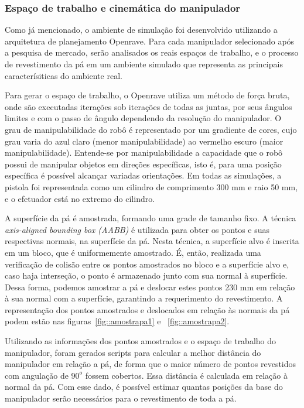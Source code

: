 \subsubsection{Espaço de trabalho e cinemática do
manipulador}\label{sec::cinematica} 
Como já mencionado, o ambiente de simulação
foi desenvolvido utilizando a arquitetura de planejamento Openrave. Para cada manipulador selecionado após a
pesquisa de mercado, serão analisados os reais espaços de trabalho, e o processo de
revestimento da pá em um ambiente simulado que representa as principais
caracterísiticas do ambiente real.

Para gerar o espaço de trabalho, o Openrave utiliza um método de força bruta,
onde são executadas iterações sob iterações de todas as juntas, por seus ângulos
limites e com o passo de ângulo dependendo da resolução do manipulador. O grau
de manipulabilidade do robô é representado por um gradiente de cores, cujo grau
varia do azul claro (menor manipulabilidade) ao vermelho escuro (maior manipulabilidade).
Entende-se por manipulabilidade a capacidade que o robô possui de manipular
objetos em direções específicas, isto é, para uma posição específica é
possível alcançar variadas orientações. Em todas as simulações, a pistola foi
representada como um cilindro de comprimento 300 mm e raio 50 mm, e o efetuador está no extremo do cilindro.

A superfície da pá é amostrada, formando uma grade de tamanho fixo. A técnica
\textit{axis-aligned bounding box (AABB)} é utilizada para obter os
pontos e suas respectivas normais, na superfície da pá. Nesta técnica, a
superfície alvo é inscrita em um bloco, que é uniformemente amostrado. É, então,
realizada uma verificação de colisão entre os pontos amostrados no bloco e a
superfície alvo e, caso haja interseção, o ponto é armazenado junto com sua
normal à superfície. Dessa forma, podemos amostrar a pá e deslocar estes pontos
230 mm em relação à sua normal com a superfície, garantindo a requerimento do
revestimento. A representação dos pontos amostrados e deslocados em relação às
normais da pá podem estão nas figuras~\ref{fig::amostrapa1} e ~\ref{fig::amostrapa2}. 

Utilizando as informações dos pontos amostrados e o espaço de trabalho do
manipulador, foram gerados scripts para calcular a
melhor distância do manipulador em relação a pá, de forma que o maior número de
pontos revestidos com angulação de $90^o$ fossem cobertos.
Essa distância é calculada em relação à normal da pá. Com esse dado, é possível estimar quantas posições da base do
manipulador serão necessários para o revestimento de toda a pá.

